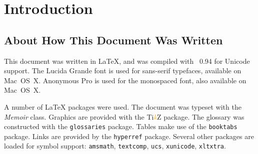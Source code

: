 \chapter{Introduction}

\section{About How This Document Was Written}
\label{sec:intro:how}
\newcommand*{\TikZ}{Ti\textcolor{orange}{\emph{k}}Z}
This document was written in \LaTeX, and was compiled with \XeTeX~0.94 for Unicode support.  The Lucida Grande font is used for sans-serif typefaces, available on Mac~OS~X.
Anonymous Pro is used for the monospaced font, also available on Mac~OS~X.

A number of \LaTeX{} packages were used.
The document was typeset with the \textit{Memoir} class.
Graphics are provided with the {\TikZ} package.
The glossary was constructed with the \texttt{glossaries} package.
Tables make use of the \texttt{booktabs} package.
Links are provided by the \texttt{hyperref} package.
Several other packages are loaded for symbol support: \texttt{amsmath},
    \texttt{textcomp}, \texttt{ucs}, \texttt{xunicode}, \texttt{xltxtra}.



